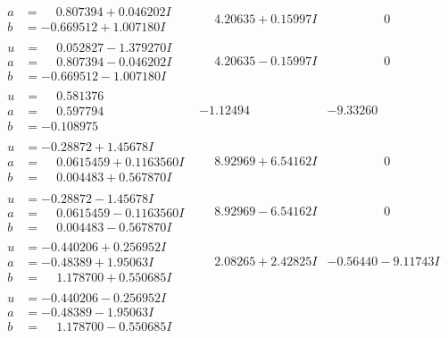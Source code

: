 \documentclass[1p]{elsarticle_modified}
\theoremstyle{definition}
\begin{document}
$$\begin{array}{c|c|c}
\begin{aligned}
a &= \phantom{-}0.807394 + 0.046202 I \\
b &= -0.669512 + 1.007180 I\end{aligned}
 & \phantom{-}4.20635 + 0.15997 I & \phantom{-0.000000 } 0 \\ \hline\begin{aligned}
u &= \phantom{-}0.052827 - 1.379270 I \\
a &= \phantom{-}0.807394 - 0.046202 I \\
b &= -0.669512 - 1.007180 I\end{aligned}
 & \phantom{-}4.20635 - 0.15997 I & \phantom{-0.000000 } 0 \\ \hline\begin{aligned}
u &= \phantom{-}0.581376\phantom{ +0.000000I} \\
a &= \phantom{-}0.597794\phantom{ +0.000000I} \\
b &= -0.108975\phantom{ +0.000000I}\end{aligned}
 & -1.12494\phantom{ +0.000000I} & -9.33260\phantom{ +0.000000I} \\ \hline\begin{aligned}
u &= -0.28872 + 1.45678 I \\
a &= \phantom{-}0.0615459 + 0.1163560 I \\
b &= \phantom{-}0.004483 + 0.567870 I\end{aligned}
 & \phantom{-}8.92969 + 6.54162 I & \phantom{-0.000000 } 0 \\ \hline\begin{aligned}
u &= -0.28872 - 1.45678 I \\
a &= \phantom{-}0.0615459 - 0.1163560 I \\
b &= \phantom{-}0.004483 - 0.567870 I\end{aligned}
 & \phantom{-}8.92969 - 6.54162 I & \phantom{-0.000000 } 0 \\ \hline\begin{aligned}
u &= -0.440206 + 0.256952 I \\
a &= -0.48389 + 1.95063 I \\
b &= \phantom{-}1.178700 + 0.550685 I\end{aligned}
 & \phantom{-}2.08265 + 2.42825 I & -0.56440 - 9.11743 I \\ \hline\begin{aligned}
u &= -0.440206 - 0.256952 I \\
a &= -0.48389 - 1.95063 I \\
b &= \phantom{-}1.178700 - 0.550685 I\end{aligned}

\end{array}$$
\end{document}
